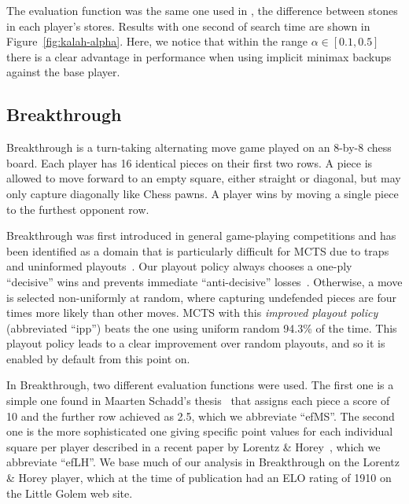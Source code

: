\documentclass{article}
\begin{document}
The evaluation function was the same one used in \cite{Ramanujan11Tradeoffs}, the difference between stones
in each player's stores. Results with one 
second of search time are shown in Figure~\ref{fig:kalah-alpha}. 
Here, we notice that within the range $\alpha \in [0.1,0.5]$ there is a clear 
advantage in performance when using implicit minimax backups against the base player. 

\subsection{Breakthrough}
\label{sec:bt}

Breakthrough is a turn-taking alternating move game played on an 8-by-8 chess board. Each player 
has 16 identical pieces on their first two rows. 
A piece is allowed to move forward to an empty square, either straight or diagonal, but may only 
capture diagonally like Chess pawns. A player wins by moving a single piece to the furthest opponent row. 

Breakthrough was first introduced in general game-playing competitions and has been identified as a domain 
that is particularly difficult for MCTS due to traps and uninformed playouts~\cite{Gudmundsson13Sufficiency}. 
Our playout policy always chooses a one-ply ``decisive'' wins and prevents immediate ``anti-decisive'' 
losses~\cite{Teytaud10On}.
Otherwise, a move is selected non-uniformly at random, where capturing undefended pieces are four times more
likely than other moves. 
MCTS with this {\it improved playout policy} (abbreviated ``ipp'') beats the one using uniform random 
94.3\% of the time. This playout policy leads to a clear improvement over random playouts, and so it is enabled 
by default from this point on.

In Breakthrough, two different evaluation functions were used. The first one is a simple one found in 
Maarten Schadd's thesis~\cite{Schadd11PhdThesis} 
that assigns each piece a score of 10 and the further row achieved as 2.5, which we abbreviate ``efMS''. The second 
one is the more sophisticated one giving specific point values for each individual square per player 
described in a recent paper by Lorentz \& Horey~\cite{Lorentz13Breakthrough}, which we abbreviate ``efLH''. 
We base much of our analysis in Breakthrough on the Lorentz \& Horey player, which 
at the time of publication had an ELO rating of 1910 on the Little Golem web site. 
\end{document}
